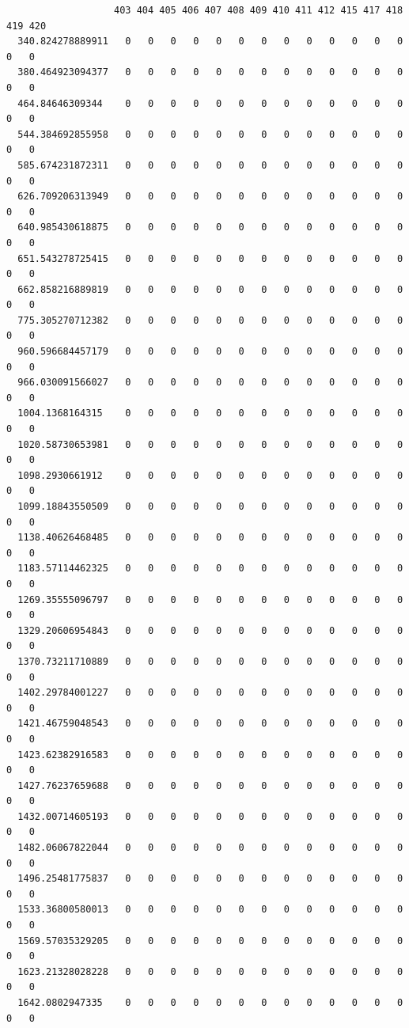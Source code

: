 \documentclass[
  letterpaper,
  DIV=11,
  numbers=noendperiod]{scrartcl}
\begin{document}
\begin{verbatim}
                   403 404 405 406 407 408 409 410 411 412 415 417 418 419 420
  340.824278889911   0   0   0   0   0   0   0   0   0   0   0   0   0   0   0
  380.464923094377   0   0   0   0   0   0   0   0   0   0   0   0   0   0   0
  464.84646309344    0   0   0   0   0   0   0   0   0   0   0   0   0   0   0
  544.384692855958   0   0   0   0   0   0   0   0   0   0   0   0   0   0   0
  585.674231872311   0   0   0   0   0   0   0   0   0   0   0   0   0   0   0
  626.709206313949   0   0   0   0   0   0   0   0   0   0   0   0   0   0   0
  640.985430618875   0   0   0   0   0   0   0   0   0   0   0   0   0   0   0
  651.543278725415   0   0   0   0   0   0   0   0   0   0   0   0   0   0   0
  662.858216889819   0   0   0   0   0   0   0   0   0   0   0   0   0   0   0
  775.305270712382   0   0   0   0   0   0   0   0   0   0   0   0   0   0   0
  960.596684457179   0   0   0   0   0   0   0   0   0   0   0   0   0   0   0
  966.030091566027   0   0   0   0   0   0   0   0   0   0   0   0   0   0   0
  1004.1368164315    0   0   0   0   0   0   0   0   0   0   0   0   0   0   0
  1020.58730653981   0   0   0   0   0   0   0   0   0   0   0   0   0   0   0
  1098.2930661912    0   0   0   0   0   0   0   0   0   0   0   0   0   0   0
  1099.18843550509   0   0   0   0   0   0   0   0   0   0   0   0   0   0   0
  1138.40626468485   0   0   0   0   0   0   0   0   0   0   0   0   0   0   0
  1183.57114462325   0   0   0   0   0   0   0   0   0   0   0   0   0   0   0
  1269.35555096797   0   0   0   0   0   0   0   0   0   0   0   0   0   0   0
  1329.20606954843   0   0   0   0   0   0   0   0   0   0   0   0   0   0   0
  1370.73211710889   0   0   0   0   0   0   0   0   0   0   0   0   0   0   0
  1402.29784001227   0   0   0   0   0   0   0   0   0   0   0   0   0   0   0
  1421.46759048543   0   0   0   0   0   0   0   0   0   0   0   0   0   0   0
  1423.62382916583   0   0   0   0   0   0   0   0   0   0   0   0   0   0   0
  1427.76237659688   0   0   0   0   0   0   0   0   0   0   0   0   0   0   0
  1432.00714605193   0   0   0   0   0   0   0   0   0   0   0   0   0   0   0
  1482.06067822044   0   0   0   0   0   0   0   0   0   0   0   0   0   0   0
  1496.25481775837   0   0   0   0   0   0   0   0   0   0   0   0   0   0   0
  1533.36800580013   0   0   0   0   0   0   0   0   0   0   0   0   0   0   0
  1569.57035329205   0   0   0   0   0   0   0   0   0   0   0   0   0   0   0
  1623.21328028228   0   0   0   0   0   0   0   0   0   0   0   0   0   0   0
  1642.0802947335    0   0   0   0   0   0   0   0   0   0   0   0   0   0   0

\end{verbatim}
\end{document}

